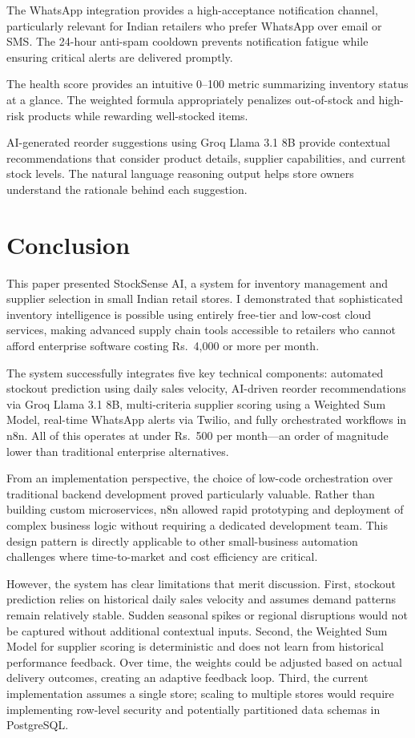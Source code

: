 \documentclass[journal]{IEEEtran}
\begin{document}
The WhatsApp integration provides a high-acceptance notification channel, particularly relevant for Indian retailers who prefer WhatsApp over email or SMS. The 24-hour anti-spam cooldown prevents notification fatigue while ensuring critical alerts are delivered promptly.

The health score provides an intuitive 0--100 metric summarizing inventory status at a glance. The weighted formula appropriately penalizes out-of-stock and high-risk products while rewarding well-stocked items.

AI-generated reorder suggestions using Groq Llama 3.1 8B provide contextual recommendations that consider product details, supplier capabilities, and current stock levels. The natural language reasoning output helps store owners understand the rationale behind each suggestion.

\section{Conclusion}

This paper presented StockSense AI, a system for inventory management and supplier selection in small Indian retail stores. I demonstrated that sophisticated inventory intelligence is possible using entirely free-tier and low-cost cloud services, making advanced supply chain tools accessible to retailers who cannot afford enterprise software costing Rs.~4,000 or more per month.

The system successfully integrates five key technical components: automated stockout prediction using daily sales velocity, AI-driven reorder recommendations via Groq Llama 3.1 8B, multi-criteria supplier scoring using a Weighted Sum Model, real-time WhatsApp alerts via Twilio, and fully orchestrated workflows in n8n. All of this operates at under Rs.~500 per month---an order of magnitude lower than traditional enterprise alternatives.

From an implementation perspective, the choice of low-code orchestration over traditional backend development proved particularly valuable. Rather than building custom microservices, n8n allowed rapid prototyping and deployment of complex business logic without requiring a dedicated development team. This design pattern is directly applicable to other small-business automation challenges where time-to-market and cost efficiency are critical.

However, the system has clear limitations that merit discussion. First, stockout prediction relies on historical daily sales velocity and assumes demand patterns remain relatively stable. Sudden seasonal spikes or regional disruptions would not be captured without additional contextual inputs. Second, the Weighted Sum Model for supplier scoring is deterministic and does not learn from historical performance feedback. Over time, the weights could be adjusted based on actual delivery outcomes, creating an adaptive feedback loop. Third, the current implementation assumes a single store; scaling to multiple stores would require implementing row-level security and potentially partitioned data schemas in PostgreSQL.
\end{document}

